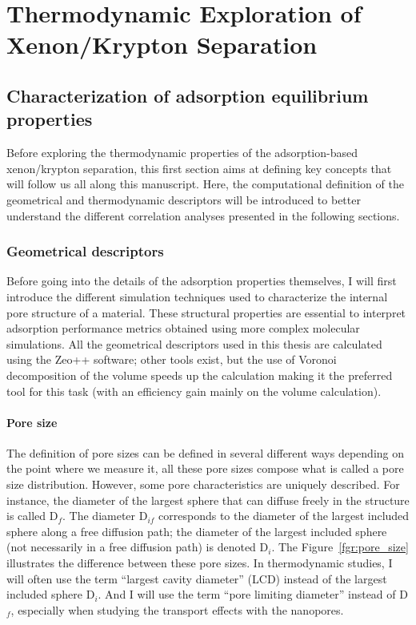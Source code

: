 \documentclass[main.tex]{subfiles}
\begin{document}
\chapter{Thermodynamic Exploration of Xenon/Krypton Separation}
\vspace*{-1\baselineskip}

\section{Characterization of adsorption equilibrium properties}

Before exploring the thermodynamic properties of the adsorption-based xenon/krypton separation, this first section aims at  defining key concepts that will follow us all along this manuscript. Here, the computational definition of the geometrical and thermodynamic descriptors will be introduced to better understand the different correlation analyses presented in the following sections.

\subsection{Geometrical descriptors}

Before going into the details of the adsorption properties themselves, I will first introduce the different simulation techniques used to characterize the internal pore structure of a material. These structural properties are essential to interpret adsorption performance metrics obtained using more complex molecular simulations. All the geometrical descriptors used in this thesis are calculated using the Zeo++ software;\autocite{Zeo++} other tools exist,\autocite{First_2013,PoreBlazer} but the use of Voronoi decomposition of the volume speeds up the calculation making it the preferred tool for this task (with an efficiency gain mainly on the volume calculation).\autocite{Rycroft_2009} 

\subsubsection{Pore size}

The definition of pore sizes can be defined in several different ways depending on the point where we measure it, all these pore sizes compose what is called a pore size distribution. However, some pore characteristics are uniquely described. For instance, the diameter of the largest sphere that can diffuse freely in the structure is called D$_f$. The diameter D$_{if}$ corresponds to the diameter of the largest included sphere along a free diffusion path; the diameter of the largest included sphere (not necessarily in a free diffusion path) is denoted D$_i$. The Figure~\ref{fgr:pore_size} illustrates the difference between these pore sizes. In thermodynamic studies, I will often use the term ``largest cavity diameter'' (LCD) instead of the largest included sphere D$_i$. And I will use the term ``pore limiting diameter''  instead of D$_f$, especially when studying the transport effects with the nanopores.
\end{document}

